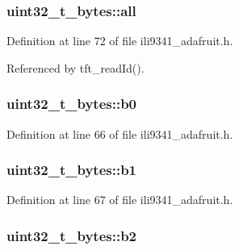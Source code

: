 \subsubsection[{\texorpdfstring{all}{all}}]{ uint32\+\_\+t\+\_\+bytes\+::all}\hypertarget{unionuint32__t__bytes_a83b0c87830b60d185365dbadf8efd4a0}{}\label{unionuint32__t__bytes_a83b0c87830b60d185365dbadf8efd4a0}


Definition at line 72 of file ili9341\+\_\+adafruit.\+h.



Referenced by tft\+\_\+read\+Id().

\subsubsection[{\texorpdfstring{b0}{b0}}]{ uint32\+\_\+t\+\_\+bytes\+::b0}\hypertarget{unionuint32__t__bytes_a92b86537decb69327191d870f41c60f7}{}\label{unionuint32__t__bytes_a92b86537decb69327191d870f41c60f7}


Definition at line 66 of file ili9341\+\_\+adafruit.\+h.

\subsubsection[{\texorpdfstring{b1}{b1}}]{ uint32\+\_\+t\+\_\+bytes\+::b1}\hypertarget{unionuint32__t__bytes_a91fb31482a2ce44b454fca964dcd556b}{}\label{unionuint32__t__bytes_a91fb31482a2ce44b454fca964dcd556b}


Definition at line 67 of file ili9341\+\_\+adafruit.\+h.

\subsubsection[{\texorpdfstring{b2}{b2}}]{ uint32\+\_\+t\+\_\+bytes\+::b2}\hypertarget{unionuint32__t__bytes_a462312b99de0c6d1c497064902196e1d}{}\label{unionuint32__t__bytes_a462312b99de0c6d1c497064902196e1d}



